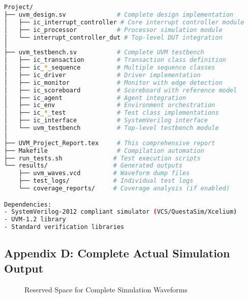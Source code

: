 \documentclass[12pt,a4paper]{article}
\begin{document}
\begin{lstlisting}[caption=Project File Structure, language=bash]
Project/
├── uvm_design.sv              # Complete design implementation
│   ├── ic_interrupt_controller # Core interrupt controller module
│   ├── ic_processor           # Processor simulation module  
│   └── interrupt_controller_dut # Top-level DUT integration
│
├── uvm_testbench.sv           # Complete UVM testbench
│   ├── ic_transaction         # Transaction class definition
│   ├── ic_*_sequence          # Multiple sequence classes
│   ├── ic_driver              # Driver implementation
│   ├── ic_monitor             # Monitor with edge detection
│   ├── ic_scoreboard          # Scoreboard with reference model
│   ├── ic_agent               # Agent integration
│   ├── ic_env                 # Environment orchestration
│   ├── ic_*_test              # Test class implementations
│   ├── ic_interface           # SystemVerilog interface
│   └── uvm_testbench          # Top-level testbench module
│
├── UVM_Project_Report.tex     # This comprehensive report
├── Makefile                   # Compilation automation
├── run_tests.sh              # Test execution scripts
└── results/                  # Generated outputs
    ├── uvm_waves.vcd         # Waveform dump files
    ├── test_logs/            # Individual test logs
    └── coverage_reports/     # Coverage analysis (if enabled)

Dependencies:
- SystemVerilog-2012 compliant simulator (VCS/QuestaSim/Xcelium)
- UVM-1.2 library
- Standard verification libraries
\end{lstlisting}

\subsection{Appendix D: Complete Actual Simulation Output}

\begin{figure}[H]
    \centering
    \vspace{6cm}
    \caption{Reserved Space for Complete Simulation Waveforms}
    \label{fig:complete_waveforms}
\end{figure}
\end{document}
